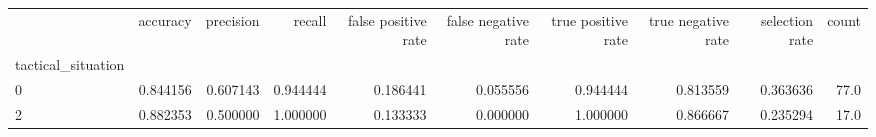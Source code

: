 \begin{tabular}{lrrrrrrrrr}
\toprule
{} &  accuracy &  precision &    recall &  false positive rate &  false negative rate &  true positive rate &  true negative rate &  selection rate &  count \\
tactical\_situation &           &            &           &                      &                      &                     &                     &                 &        \\
\midrule
0                  &  0.844156 &   0.607143 &  0.944444 &             0.186441 &             0.055556 &            0.944444 &            0.813559 &        0.363636 &   77.0 \\
2                  &  0.882353 &   0.500000 &  1.000000 &             0.133333 &             0.000000 &            1.000000 &            0.866667 &        0.235294 &   17.0 \\
\bottomrule
\end{tabular}
